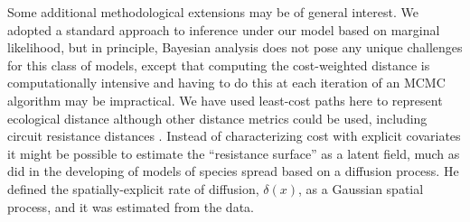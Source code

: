 \documentclass[12pt]{article}
\begin{document}
\begin{spacing}{1.8}
Some additional methodological extensions may be of general interest.
We adopted a standard approach to inference under our model based on
marginal likelihood, but in principle,
Bayesian analysis does not pose any unique challenges for this
class of models, except that computing the cost-weighted distance is
computationally intensive and having to do this at each iteration of
an MCMC algorithm may be impractical. We have used least-cost paths here to represent ecological distance
although other distance metrics could be used, including circuit
resistance distances \citep{mcrae:2006}. Instead of
characterizing cost with explicit covariates it might be possible to
estimate the ``resistance surface'' as a latent field, much as
\citet{wikle:2003} did in the developing of models of species spread
based on a diffusion process. He defined the spatially-explicit rate
of diffusion, $\delta(x)$, as a Gaussian spatial process, and it was
estimated from the data.









\newpage





\end{spacing}



\clearpage

\newpage
\end{document}
